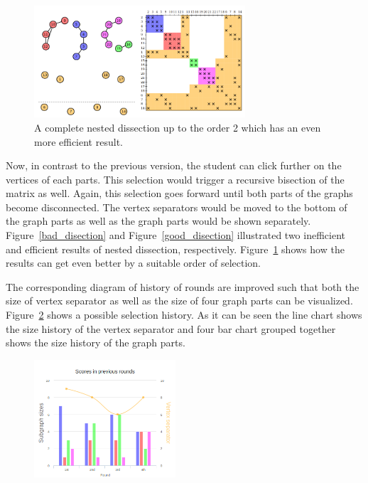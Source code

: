 \documentclass[12pt, oneside]{book}
\begin{document}
\begin{figure}
\centering
\includegraphics[width=0.7\textwidth]{good_disection2}
\caption{A complete nested dissection up to the order 2 which has an 
even more efficient result.}
\label{good_disection2}
\end{figure}

Now, in contrast to the previous version, the student can click further
on the vertices of each parts. This selection would trigger a recursive
bisection of the matrix as well. Again, this selection goes forward until
both parts of the graphs become disconnected. The vertex separators
would be moved to the bottom of the graph parts as well as the graph parts
would be shown separately. Figure~\ref{bad_disection} and Figure~\ref{good_disection}
illustrated two inefficient and efficient results of nested dissection,
respectively. Figure~\ref{good_disection2} shows how the results can 
get even better by a suitable order of selection.


The corresponding diagram of history of rounds are improved such that
both the size of vertex separator as well as the size of four graph parts
can be visualized. Figure~\ref{barchart} shows a possible selection history.
As it can be seen the line chart shows the size history of the vertex separator
and four bar chart grouped together shows the size history of the graph parts.

\begin{figure}
\centering
\includegraphics[width=0.47\textwidth]{chart2}
\caption{}
\label{barchart}
\end{figure}
\end{document}
